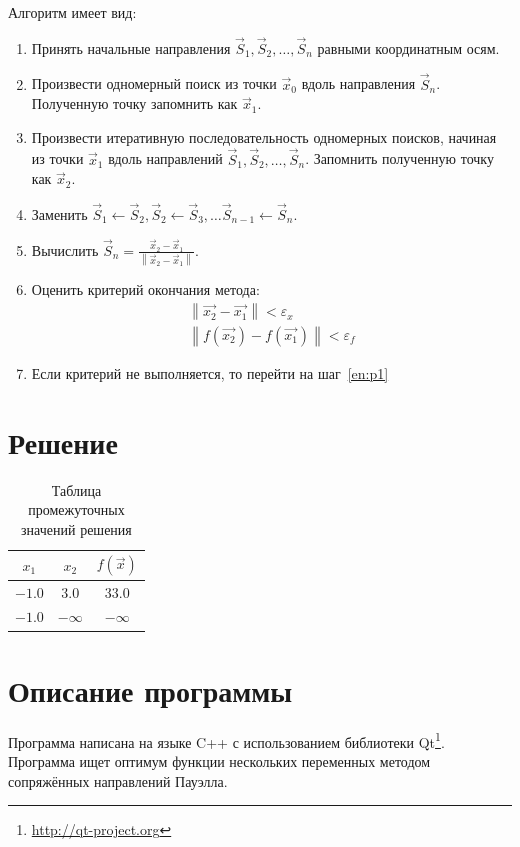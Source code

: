 \documentclass[a4paper,12pt,notitlepage,headsepline,pdftex]{scrartcl}
\begin{document}
  Алгоритм имеет вид:
  \begin{enumerate}
    \item Принять начальные направления $\vec{S}_1, \vec{S}_2, \dots, \vec{S}_n$ равными
      координатным осям.
    \item\label{en:p1} Произвести одномерный поиск из точки $\vec{x}_0$ вдоль направления
      $\vec{S}_n$.
      Полученную точку запомнить как $\vec{x}_1$.
    \item Произвести итеративную последовательность одномерных поисков,
      начиная из точки $\vec{x}_1$ вдоль направлений $\vec{S}_1, \vec{S}_2,
      \dots, \vec{S}_n$.
      Запомнить полученную точку как $\vec{x}_2$.
    \item Заменить $\vec{S}_1 \leftarrow \vec{S}_2, \vec{S}_2 \leftarrow
      \vec{S}_3, \dots \vec{S}_{n-1} \leftarrow \vec{S}_n$.
    \item Вычислить $\displaystyle \vec{S}_n = \frac{\vec{x}_2 -
      \vec{x}_1}{\left\|\vec{x}_2 - \vec{x}_1\right\|}$.
    \item Оценить критерий окончания метода:
      \begin{eqnarray}
        \left\| \vec{x_2} - \vec{x_1}\right\| < \varepsilon_x\\
        \left\| f\left( \vec{x_2} \right) - f\left( \vec{x_1} \right)
        \right\| < \varepsilon_f
        \label{eq:cr}
      \end{eqnarray}
    \item Если критерий не выполняется, то перейти на шаг~\ref{en:p1}
  \end{enumerate}
  \newpage
\section{Решение}


  \begin{table}[h]
    \centering
    \begin{tabular}{|c|c|c|}
      \hline
      $x_1$ & $x_2$ & $f\left( \vec{x} \right)$\\
      \hline
      $-1.0$ & $3.0$ & $33.0$\\
      $-1.0$ & $-\infty$ & $-\infty$\\
      \hline
    \end{tabular}
    \caption{Таблица промежуточных значений решения}
    \label{tab:tabs}
  \end{table}

\section{Описание программы}
  Программа написана на языке C++ с использованием библиотеки
  Qt\footnote{\url{http://qt-project.org}}.
  Программа ищет оптимум функции нескольких переменных методом сопряжённых
  направлений Пауэлла.
\end{document}
